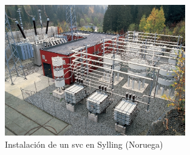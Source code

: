 \vspace{3mm}

\begin{figure}[h!]
  \centering
  \includegraphics[width=0.7\textwidth]{img/teoria/svc.png}
  \caption{Instalación de un \acrshort{svc} en Sylling (Noruega) \cite{facts}}
  \label{fig:svc}
\end{figure}

